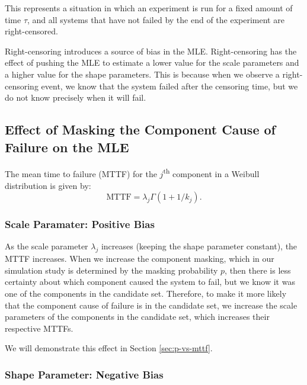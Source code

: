 \documentclass[
]{article}
\begin{document}
This represents a situation in which an experiment is run for a fixed
amount of time \(\tau\), and all systems that have not failed by the end
of the experiment are right-censored.

Right-censoring introduces a source of bias in the MLE. Right-censoring
has the effect of pushing the MLE to estimate a lower value for the
scale parameters and a higher value for the shape parameters. This is
because when we observe a right-censoring event, we know that the system
failed after the censoring time, but we do not know precisely when it
will fail.

\hypertarget{effect-of-masking-the-component-cause-of-failure-on-the-mle}{%
\subsection{Effect of Masking the Component Cause of Failure on the
MLE}\label{effect-of-masking-the-component-cause-of-failure-on-the-mle}}

The mean time to failure (MTTF) for the \(j\)\textsuperscript{th}
component in a Weibull distribution is given by: \[
\text{MTTF} = \lambda_j \Gamma(1 + 1/k_j).
\]

\hypertarget{scale-paramater-positive-bias}{%
\subsubsection*{Scale Paramater: Positive
Bias}\label{scale-paramater-positive-bias}}

As the scale parameter \(\lambda_j\) increases (keeping the shape
parameter constant), the MTTF increases. When we increase the component
masking, which in our simulation study is determined by the masking
probability \(p\), then there is less certainty about which component
caused the system to fail, but we know it was one of the components in
the candidate set. Therefore, to make it more likely that the component
cause of failure is in the candidate set, we increase the scale
parameters of the components in the candidate set, which increases their
respective MTTFs.

We will demonstrate this effect in Section \ref{sec:p-vs-mttf}.

\hypertarget{shape-parameter-negative-bias}{%
\subsubsection*{Shape Parameter: Negative
Bias}\label{shape-parameter-negative-bias}}
\end{document}
